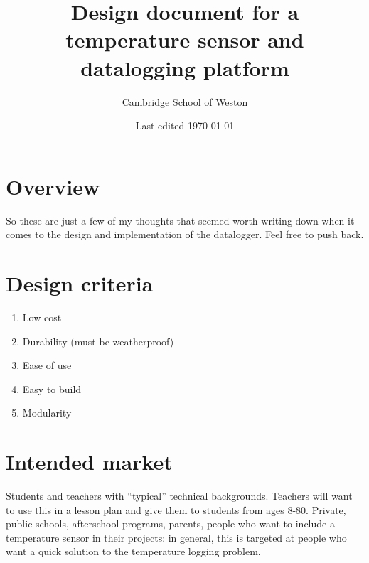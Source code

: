 \documentclass[11pt]{article}
\title{Design document for a temperature sensor and datalogging platform}
\author{Cambridge School of Weston}
\date{Last edited \today}
\begin{document}
\maketitle
\section{Overview}
So these are just a few of my thoughts that seemed worth writing down when it comes to the design and implementation of the datalogger.  Feel free to push back.

\section{Design criteria}
\begin{enumerate}
\item Low cost
\item Durability (must be weatherproof)
\item Ease of use
\item Easy to build
\item Modularity
\end{enumerate}

\section{Intended market}
Students and teachers with ``typical'' technical backgrounds.  Teachers will want to use this in a lesson plan and give them to students from ages 8-80.  Private, public schools, afterschool programs, parents, people who want to include a temperature sensor in their projects: in general, this is targeted at people who want a quick solution to the temperature logging problem.
\end{document}
